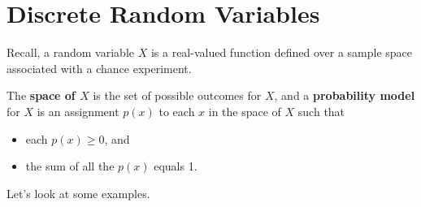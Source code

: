 \documentclass[
]{book}
\providecommand{\tightlist}{%
  \setlength{\itemsep}{0pt}\setlength{\parskip}{0pt}}
\theoremstyle{definition}
\theoremstyle{definition}
\theoremstyle{definition}
\theoremstyle{definition}
\theoremstyle{remark}
\begin{document}
\chapter{Discrete Random Variables}\label{discrete-random-variables-1}

Recall, a random variable \(X\) is a real-valued function defined over a sample space associated with a chance experiment.

The \textbf{space of \(X\)} is the set of possible outcomes for \(X\), and a \textbf{probability model} for \(X\) is an assignment \(p(x)\) to each \(x\) in the space of \(X\) such that

\begin{itemize}
\tightlist
\item
  each \(p(x) \geq 0\), and
\item
  the sum of all the \(p(x)\) equals 1.
\end{itemize}

Let's look at some examples.
\end{document}
